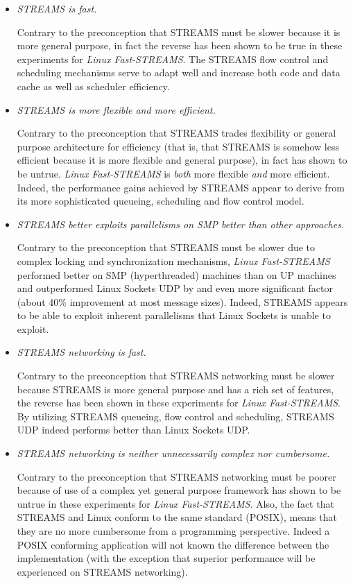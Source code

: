 \documentclass[letterpaper,final,notitlepage,twocolumn,10pt,twoside]{article}
\begin{document}
\begin{itemize}

\item \textit{STREAMS is fast.}

Contrary to the preconception that STREAMS must be slower because it is more general purpose, in
fact the reverse has been shown to be true in these experiments for \textsl{Linux Fast-STREAMS}.
The STREAMS flow control and scheduling mechanisms serve to adapt well and increase both code and
data cache as well as scheduler efficiency.

\item \textit{STREAMS is more flexible {\em and} more efficient.}

Contrary to the preconception that STREAMS trades flexibility or general purpose architecture for
efficiency (that is, that STREAMS is somehow less efficient because it is more flexible and general
purpose), in fact has shown to be untrue.  \textsl{Linux Fast-STREAMS} is {\em both} more flexible
{\em and} more efficient.  Indeed, the performance gains achieved by  STREAMS appear to derive from
its more sophisticated queueing, scheduling and flow control model.

\item \textit{STREAMS better exploits parallelisms on SMP better than other approaches.}

Contrary to the preconception that STREAMS must be slower due to complex locking and synchronization
mechanisms, \textsl{Linux Fast-STREAMS} performed better on SMP (hyperthreaded) machines than on UP
machines and outperformed Linux Sockets UDP by and even more significant factor (about 40\%
improvement at most message sizes).  Indeed, STREAMS appears to be able to exploit inherent
parallelisms that Linux Sockets is unable to exploit.

\item \textit{STREAMS networking is fast.}

Contrary to the preconception that STREAMS networking must be slower because STREAMS is more general
purpose and has a rich set of features, the reverse has been shown in these experiments for
\textsl{Linux Fast-STREAMS}.  By utilizing STREAMS queueing, flow control and scheduling, STREAMS
UDP indeed performs better than Linux Sockets UDP.

\item \textit{STREAMS networking is neither unnecessarily complex nor cumbersome.}

Contrary to the preconception that STREAMS networking must be poorer because of use of a complex yet
general purpose framework has shown to be untrue in these experiments for \textsl{Linux
Fast-STREAMS}.  Also, the fact that STREAMS and Linux conform to the same standard (POSIX), means
that they are no more cumbersome from a programming perspective.  Indeed a POSIX conforming
application will not known the difference between the implementation (with the exception that
superior performance will be experienced on STREAMS networking).

\end{itemize}
\end{document}
